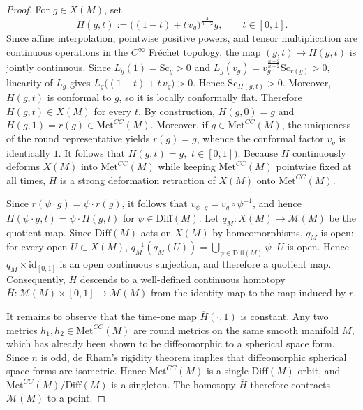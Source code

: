 \documentclass[12pt,oneside,a4paper]{article}
\theoremstyle{mytheorem}
\theoremstyle{remark}
\theoremstyle{definition}
\begin{document}
\begin{proof}
For $g\in X(M)$, set
\[
H(g,t):=\bigl((1-t)+t\,v_g\bigr)^{\frac{4}{n-2}}g,
\qquad t\in[0,1].
\]
Since affine interpolation, pointwise positive powers, and tensor
multiplication are continuous operations in the $C^\infty$ Fr\'echet
topology, the map $(g,t)\mapsto H(g,t)$ is jointly continuous.
Since $L_g(1)=\mathrm{Sc}_g>0$ and
\(L_g(v_g)=v_g^{\frac{n+2}{n-2}}\mathrm{Sc}_{r(g)}>0\),
linearity of $L_g$ gives
$L_g\bigl((1-t)+t\,v_g\bigr)>0$. Hence
$\mathrm{Sc}_{H(g,t)}>0$. Moreover, $H(g,t)$ is conformal to $g$, so it is
locally conformally flat. Therefore $H(g,t)\in X(M)$ for every $t$.
By construction, $H(g,0) = g$ and $H(g,1) = r(g) \in \mathrm{Met}^{CC}(M)$. Moreover, if $g \in \mathrm{Met}^{CC}(M)$, the uniqueness of the round representative yields $r(g) = g$, whence the conformal factor $v_g$ is identically $1$. It follows that $H(g,t)=g,$ $t\in[0,1]).$
Because $H$ continuously deforms $X(M)$ into $\mathrm{Met}^{CC}(M)$ while keeping $\mathrm{Met}^{CC}(M)$ pointwise fixed at all times, $H$ is a strong deformation retraction of $X(M)$ onto $\mathrm{Met}^{CC}(M)$.


Since $r(\psi\cdot g)=\psi\cdot r(g)$, it follows that
$v_{\psi\cdot g}=v_g\circ\psi^{-1}$, and hence
\(H(\psi\cdot g,t)=\psi\cdot H(g,t)\)
for \(\psi\in\mathrm{Diff}(M)\).
Let $q_M\colon X(M)\to\mathcal{M}(M)$ be the quotient map. Since
$\mathrm{Diff}(M)$ acts on $X(M)$ by homeomorphisms, $q_M$ is open:
for every open $U\subset X(M)$,
\(q_M^{-1}(q_M(U))
=
\bigcup_{\psi\in\mathrm{Diff}(M)}\psi\cdot U\)
is open. Hence $q_M\times\mathrm{id}_{[0,1]}$ is an open continuous
surjection, and therefore a quotient map. Consequently, $H$ descends to a
well-defined continuous homotopy
\(\overline H\colon\mathcal{M}(M)\times[0,1]\to \mathcal{M}(M)\)
from the identity map to the map induced by $r$.

It remains to observe that the time-one map $\overline H(\cdot,1)$ is
constant. Any two metrics $h_1,h_2\in\mathrm{Met}^{CC}(M)$ are round metrics on the same
smooth manifold $M$, which has already been shown to be diffeomorphic to a
spherical space form. Since $n$ is odd, de Rham's rigidity theorem
\cite[pp.~66--67]{MR43468} implies that diffeomorphic spherical space forms
are isometric. Hence
$\mathrm{Met}^{CC}(M)$ is a single $\mathrm{Diff}(M)$-orbit, and
\(
\mathrm{Met}^{CC}(M)/\mathrm{Diff}(M)
\)
is a singleton. The homotopy $\overline H$ therefore contracts
$\mathcal{M}(M)$ to a point.
\end{proof}
\end{document}
